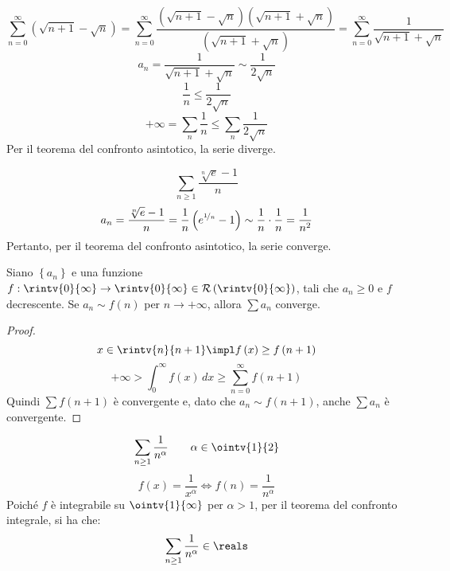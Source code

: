 \begin{example}
  $$\sum_{n=0}^\infty\left( \sqrt{n+1}-\sqrt{n} \right)=\sum_{n=0}^\infty\frac{\left( \sqrt{n+1}-\sqrt{n} \right)\left( \sqrt{n+1}+\sqrt{n} \right)}{\left( \sqrt{n+1}+\sqrt{n} \right)}=\sum_{n=0}^\infty\frac{1}{\sqrt{n+1}+\sqrt{n}}$$
  $$a_n=\frac{1}{\sqrt{n+1}+\sqrt{n}}\sim \frac{1}{2\sqrt{n}}$$
  $$\frac{1}{n}\le \frac{1}{2\sqrt{n}}$$
  $$+\infty=\sum_n\frac{1}{n}\le\sum_n\frac{1}{2\sqrt{n}}$$
  Per il teorema del confronto asintotico, la serie diverge.
\end{example}

\begin{example}
  $$\sum_{n\ge1}\frac{\sqrt[n]{e}-1}{n}$$
  $$a_n=\frac{\sqrt[n]{e}-1}{n}=\frac{1}{n}\left( e^{\nicefrac{1}{n}}-1 \right)\sim \frac{1}{n}\cdot \frac{1}{n}=\frac{1}{n^2}$$
  Pertanto, per il teorema del confronto asintotico, la serie converge.
\end{example}

\begin{theorem}
  Siano $\left\{ a_n \right\}$ e una funzione $f:\rintv{0}{\infty}\to\rintv{0}{\infty}\in\mathcal{R}\left( \rintv{0}{\infty} \right)$, tali che $a_n\ge0$ e $f$ decrescente.
  Se $a_n\sim f\left( n \right)$ per $n\to+\infty$, allora $\sum a_n$ converge.
\end{theorem}
\begin{proof}
  $$x\in\rintv{n}{n+1}\impl f\left( x \right)\ge f\left( n+1 \right)$$
  $$+\infty>\int_0^\infty f\left( x \right)\,dx\ge\sum_{n=0}^\infty f\left( n+1 \right)$$
  Quindi $\sum f\left( n+1 \right)$ è convergente e, dato che $a_n\sim f\left( n+1 \right)$, anche $\sum a_n$ è convergente.
\end{proof}

\begin{example}
  $$\sum_{n\ge1}\frac{1}{n^\alpha}\qquad\alpha\in\ointv{1}{2}$$
  $$f\left( x \right)=\frac{1}{x^\alpha}\iff f\left( n \right)=\frac{1}{n^\alpha}$$
  Poiché $f$ è integrabile su $\ointv{1}{\infty}$ per $\alpha>1$, per il teorema del confronto integrale, si ha che:
  $$\sum_{n\ge1}\frac{1}{n^\alpha}\in\reals$$
\end{example}

